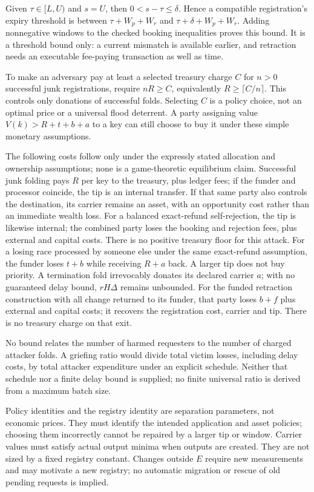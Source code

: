 \hand Given $\tau\in[L,U)$ and $s=U$, then $0<s-\tau\le\delta$.
Hence a compatible registration's expiry threshold is between
$\tau+W_p+W_r$ and $\tau+\delta+W_p+W_r$. Adding nonnegative windows to the
checked booking inequalities proves this bound. It is a threshold bound only:
a current mismatch is available earlier, and retraction needs an executable
fee-paying transaction as well as time.

\proposed To make an adversary pay at least a selected treasury charge $C$
for $n>0$ successful junk registrations, require $nR\ge C$, equivalently
$R\ge\lceil C/n\rceil$. This controls only donations of successful folds.
Selecting $C$ is a policy choice, not an optimal price or a universal flood
deterrent. A party assigning value $V(k)>R+t+b+a$ to a key can still choose
to buy it under these simple monetary assumptions.

\hand The following costs follow only under the expressly stated allocation
and ownership assumptions; none is a game-theoretic equilibrium claim.
Successful junk folding pays $R$ per key to the treasury, plus ledger fees;
if the funder and processor coincide, the tip is an internal transfer.
If that same party also controls the destination, its carrier remains an
asset, with an opportunity cost rather than an immediate wealth loss.
For a balanced exact-refund self-rejection, the tip is likewise internal;
the combined party loses the booking and rejection fees, plus external and
capital costs. There is no positive treasury floor for this attack.
For a losing race processed by someone else under the same exact-refund
assumption, the funder loses $t+b$ while receiving $R+a$ back. A larger tip
does not buy priority. A termination fold irrevocably donates its declared
carrier $a$; with no guaranteed delay bound, $rH\Delta$ remains unbounded.
For the funded retraction construction with all change returned to its
funder, that party loses $b+f$ plus external and capital costs; it recovers
the registration cost, carrier and tip. There is no treasury charge on that exit.

No bound relates the number of harmed requesters to the number of charged
attacker folds. A griefing ratio would divide total victim losses, including
delay costs, by total attacker expenditure under an explicit schedule. Neither
that schedule nor a finite delay bound is supplied; no finite universal ratio
is derived from a maximum batch size.

Policy identities and the registry identity are separation parameters, not
economic prices. They must identify the intended application and asset policies;
choosing them incorrectly cannot be repaired by a larger tip or window.
Carrier values must satisfy actual output minima when outputs are created.
They are not sized by a fixed registry constant. Changes outside $E$ require
new measurements and may motivate a new registry; no automatic migration or
rescue of old pending requests is implied.

